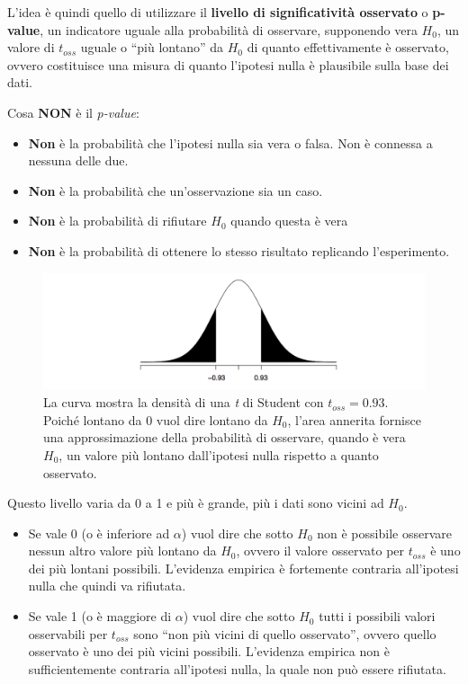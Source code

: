 L'idea è quindi quello di utilizzare il \textbf{livello di significatività osservato} o \textbf{p-value}, un indicatore uguale alla probabilità di osservare, supponendo vera $ H_0 $, un valore di $ t_{oss} $ uguale o ``più lontano'' da $ H_0 $ di quanto effettivamente è osservato, ovvero costituisce una misura di quanto l'ipotesi nulla è plausibile sulla base dei dati.

Cosa \textbf{NON} è il \textit{p-value}:
\begin{itemize}
	\item \textbf{Non} è la probabilità che l'ipotesi nulla sia vera o falsa. Non è connessa a nessuna delle due.
	\item \textbf{Non} è la probabilità che un'osservazione sia un caso.
	\item \textbf{Non} è la probabilità di rifiutare $ H_0 $ quando questa è vera
	\item \textbf{Non} è la probabilità di ottenere lo stesso risultato replicando l'esperimento.
\end{itemize}


\begin{figure}[htbp]
\centering
\includegraphics[width=.9\textwidth]{./notes/immagini/l6-fig7.png}
\caption{La curva mostra la densità di una \textit{t} di Student con $ t_{oss} = 0.93 $. Poiché lontano da 0 vuol dire lontano da $ H_0 $, l'area annerita fornisce una approssimazione della probabilità di osservare, quando è vera $ H_0 $, un valore più lontano dall'ipotesi nulla rispetto a quanto osservato.}
\end{figure}


Questo livello varia da 0 a 1 e più è grande, più i dati sono vicini ad $ H_0 $.

\begin{itemize}
\item
  Se vale 0 (o è inferiore ad $ \alpha $) vuol dire che sotto $ H_0 $ non è possibile osservare nessun
  altro valore più lontano da $ H_0 $, ovvero il valore osservato per $ t_{oss} $
  è uno dei più lontani possibili. L'evidenza empirica è fortemente contraria all'ipotesi nulla che quindi va rifiutata.
\item
  Se vale 1 (o è maggiore di $ \alpha $) vuol dire che sotto $ H_0 $ tutti i possibili valori osservabili
  per $ t_{oss} $ sono ``non più vicini di quello osservato'', ovvero quello
  osservato è uno dei più vicini possibili. L'evidenza empirica non è sufficientemente contraria all'ipotesi nulla, la quale non può essere rifiutata.
\end{itemize}

